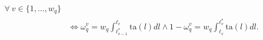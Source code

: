 \documentclass[hidelinks, nonatbib]{elsarticle}
\begin{document}
\begin{enumerate}
\begin{align}
        \
        \forall
        \
        v \in \{1, \dots, w_q\}
        \\
        &\iff
        \omega_{q}^{v}
        =
        w_q
        \int_{
            \ell_{v-1}^{*}
        }^{
            \ell_{v}
        }{
            \text{ta}(l)
            dl
        }
        \land
        1 - \omega_{q}^{v}
        =
        w_q
        \int_{
            \ell_{v}
        }^{
            \ell_{v}^{*}
        }{
            \text{ta}(l)
            dl
        }
        .
    \end{align}

\end{enumerate}
\end{document}
